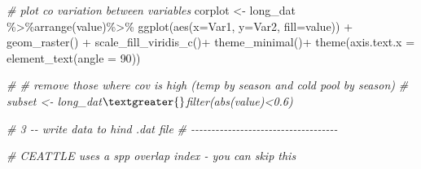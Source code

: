 \documentclass[
]{article}
\newenvironment{Shaded}{\begin{snugshade}}{\end{snugshade}}
\newcommand{\AttributeTok}[1]{\textcolor[rgb]{0.77,0.63,0.00}{#1}}
\newcommand{\CommentTok}[1]{\textcolor[rgb]{0.56,0.35,0.01}{\textit{#1}}}
\newcommand{\DecValTok}[1]{\textcolor[rgb]{0.00,0.00,0.81}{#1}}
\newcommand{\FunctionTok}[1]{\textcolor[rgb]{0.00,0.00,0.00}{#1}}
\newcommand{\NormalTok}[1]{#1}
\newcommand{\OtherTok}[1]{\textcolor[rgb]{0.56,0.35,0.01}{#1}}
\newcommand{\SpecialCharTok}[1]{\textcolor[rgb]{0.00,0.00,0.00}{#1}}
\begin{document}
\begin{Shaded}
\begin{Highlighting}[]
\CommentTok{\# plot co variation between variables}
\NormalTok{corplot }\OtherTok{\textless{}{-}}\NormalTok{ long\_dat }\SpecialCharTok{\%\textgreater{}\%}\FunctionTok{arrange}\NormalTok{(value)}\SpecialCharTok{\%\textgreater{}\%}
  \FunctionTok{ggplot}\NormalTok{(}\FunctionTok{aes}\NormalTok{(}\AttributeTok{x=}\NormalTok{Var1, }\AttributeTok{y=}\NormalTok{Var2, }\AttributeTok{fill=}\NormalTok{value)) }\SpecialCharTok{+} 
  \FunctionTok{geom\_raster}\NormalTok{() }\SpecialCharTok{+} 
  \FunctionTok{scale\_fill\_viridis\_c}\NormalTok{()}\SpecialCharTok{+}
  \FunctionTok{theme\_minimal}\NormalTok{()}\SpecialCharTok{+}
  \FunctionTok{theme}\NormalTok{(}\AttributeTok{axis.text.x =} \FunctionTok{element\_text}\NormalTok{(}\AttributeTok{angle =} \DecValTok{90}\NormalTok{))}

\CommentTok{\# \# remove those where cov is high (temp by season and cold pool by season)}
\CommentTok{\# subset \textless{}{-} long\_dat$\textgreater{}$filter(abs(value)\textless{}0.6)}

\CommentTok{\# 3 {-}{-} write data to hind .dat file}
\CommentTok{\# {-}{-}{-}{-}{-}{-}{-}{-}{-}{-}{-}{-}{-}{-}{-}{-}{-}{-}{-}{-}{-}{-}{-}{-}{-}{-}{-}{-}{-}{-}{-}{-}{-}{-}{-}{-}}


\CommentTok{\# CEATTLE uses a spp overlap index {-} you can skip this}


\end{Highlighting}
\end{Shaded}
\end{document}
